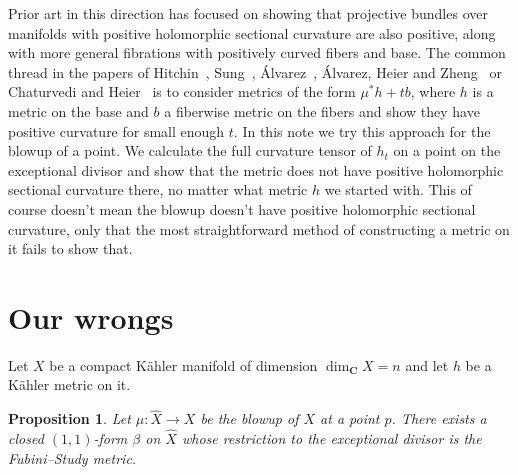 \documentclass[10pt,a4paper]{amsart}
\newtheorem{prop}[theo]{Proposition}
\def\CC{\mathbf{C}}
\def\fs{b}
\def\hsc{holomorphic sectional curvature}
\def\bl#1{\widehat{#1}}
\def\blX{\bl{X}}
\begin{document}
Prior art in this direction has focused on showing that projective bundles
over manifolds with positive \hsc{} are also positive, along with more
general fibrations with positively curved fibers and base.
The common thread in the papers of
Hitchin~\cite{hitchin1975curvature},
Sung~\cite{sung1997kahler},
\'Alvarez~\cite{alvarez2016positive},
\'Alvarez,
Heier and Zheng~\cite{alvarez2018projectivized} or Chaturvedi and
Heier~\cite{chaturvedi2020hermitian}
is to consider metrics of the form $\mu^* h + t \fs$, where $h$ is a metric
on the base and $\fs$ a fiberwise metric on the fibers and show they have
positive curvature for small enough $t$.
In this note we try this approach for the blowup of a point.
We calculate the full curvature tensor of $h_t$ on a point on the exceptional
divisor and show that the metric
does not have positive \hsc{} there, no matter what metric $h$ we started with.
This of course doesn't mean the blowup doesn't have positive \hsc{}, only that
the most straightforward method of constructing a metric on it fails to show that.





\section{Our wrongs}

Let $X$ be a compact K\"ahler manifold of dimension $\dim_{\CC} X = n$
and let $h$ be a K\"ahler metric on it.


\begin{prop}
\label{prop:fs}
Let $\mu : \bl X \to X$ be the blowup of $X$ at a point $p$.
There exists a closed $(1,1)$-form $\beta$ on $\blX$ whose restriction to
the exceptional divisor is the Fubini--Study metric.
\end{prop}
\end{document}
